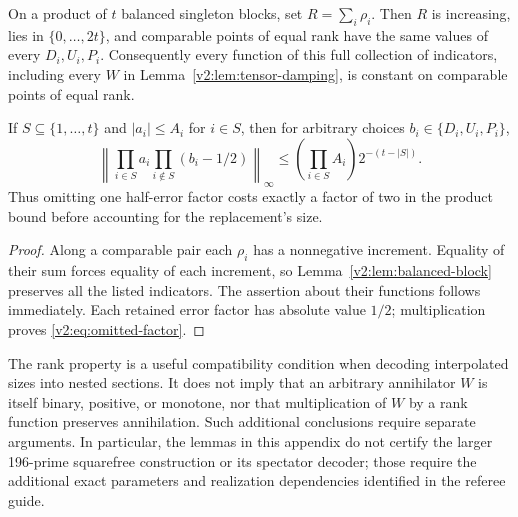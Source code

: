 \begin{proposition}
\label{v2:prop:damping-rank}
On a product of $t$ balanced singleton blocks, set
$R=\sum_i\rho_i$.  Then $R$ is increasing, lies in $\{0,\ldots,2t\}$,
and comparable points of equal rank have the same values of every
$D_i,U_i,P_i$.  Consequently every function of this full collection of
indicators, including every $W$ in Lemma~\ref{v2:lem:tensor-damping},
is constant on comparable points of equal rank.

If $S\subseteq\{1,\ldots,t\}$ and $|a_i|\le A_i$ for $i\in S$, then
for arbitrary choices $b_i\in\{D_i,U_i,P_i\}$,
\begin{equation}\label{v2:eq:omitted-factor}
 \left\|\prod_{i\in S}a_i\prod_{i\notin S}(b_i-1/2)\right\|_\infty
 \le \left(\prod_{i\in S}A_i\right)2^{-(t-|S|)}.
\end{equation}
Thus omitting one half-error factor costs exactly a factor of two in the
product bound before accounting for the replacement's size.
\end{proposition}
\begin{proof}
Along a comparable pair each $\rho_i$ has a nonnegative increment.
Equality of their sum forces equality of each increment, so
Lemma~\ref{v2:lem:balanced-block} preserves all the listed indicators.
The assertion about their functions follows immediately.  Each retained
error factor has absolute value $1/2$; multiplication proves
\eqref{v2:eq:omitted-factor}.
\end{proof}

The rank property is a useful compatibility condition when decoding
interpolated sizes into nested sections.  It does not imply that an
arbitrary annihilator $W$ is itself binary, positive, or monotone, nor
that multiplication of $W$ by a rank function preserves annihilation.
Such additional conclusions require separate arguments.  In particular,
the lemmas in this appendix do not certify the larger 196-prime
squarefree construction or its spectator decoder; those require the
additional exact parameters and realization dependencies identified in
the referee guide.
